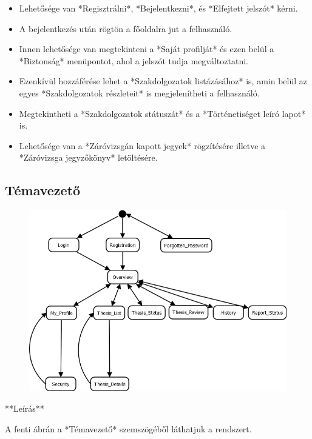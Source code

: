 \documentclass[a4paper,12pt]{article}
\begin{document}
\begin{itemize}
	\item Lehetősége van *Regisztrálni*, *Bejelentkezni*, és *Elfejtett jelszót* kérni. 
	\item A bejelentkezés után rögtön a főoldalra jut a felhasználó. 
	\item Innen lehetősége van megtekinteni a *Saját profilját* és ezen belül a *Biztonság* menüpontot, ahol a jelszót tudja megváltoztatni. 
	\item Ezenkívül hozzáférése lehet a *Szakdolgozatok listázásához* is, amin belül az egyes *Szakdolgozatok részleteit* is megjelenítheti a felhasználó. 
	\item Megtekintheti a *Szakdolgozatok státuszát* és a *Történetiséget leíró lapot* is. 
	\item Lehetősége van a *Záróvizsgán kapott jegyek* rögzítésére illetve a *Záróvizsga jegyzőkönyv* letöltésére. 
\end{itemize}

\subsection{Témavezető}

\begin{figure}
	\centering
	\includegraphics[width=\textwidth]{images/Lapok_kozotti_atmenetek/Temavezeto.png}
	\caption{}
	\label{fig:Temavezeto}
\end{figure}

**Leírás**

A fenti ábrán a *Témavezető* szemszögéből láthatjuk a rendszert.
\end{document}
